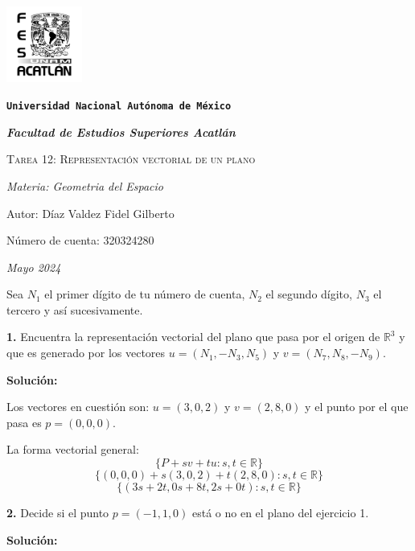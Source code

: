 \documentclass{article}
\begin{document}
\begin{titlepage}
    \centering   
    {\includegraphics[width=2.5cm]{logo.png}\par}
    {\texttt{\bfseries \LARGE Universidad Nacional Autónoma de México} \par}
    \vspace{1cm}
    {\itshape \Large \bfseries Facultad de Estudios Superiores Acatlán \par}
    \vspace{3cm}
    {\scshape \Huge Tarea 12: Representación vectorial de un plano\par}
    \vspace {3cm}
    {\slshape \Large Materia: Geometria del Espacio \par}
    \vspace{2cm}
    {\Large Autor: Díaz Valdez Fidel Gilberto\par}
    {\Large Número de cuenta: 320324280\par}
    \vfill
    {\itshape Mayo 2024 \par}
\end{titlepage}
Sea $N_1$ el primer dígito de tu número de cuenta, $N_2$ el segundo dígito, $N_3$ el tercero y así
sucesivamente.
\vspace{10pt}

\textbf{1.} Encuentra la representación vectorial del plano que pasa por el origen de $\mathbb{R}^3$ y que es generado por los 
vectores $u = (N_1, -N_3, N_5)$ y $v = (N_7, N_8, -N_9)$.
\vspace{10pt}

\textbf{Solución:}
\vspace{10pt}

Los vectores en cuestión son: $u = (3, 0, 2)$ y $v = (2, 8, 0)$ y el punto por el que pasa es $p=(0,0,0)$.

La forma vectorial general: 
$$\{P+sv+tu: s,t \in \mathbb{R}\}$$
$$\{(0,0,0)+s(3,0,2)+t(2,8,0): s,t \in \mathbb{R}\}$$
$$\{(3s+2t,0s+8t,2s+0t): s,t \in \mathbb{R}\}$$
\vspace{10pt}

\textbf{2.} Decide si el punto $p =(-1,1,0)$ está o no en el plano del ejercicio 1.
\vspace{10pt}

\textbf{Solución:}
\vspace{10pt}
\end{document}
